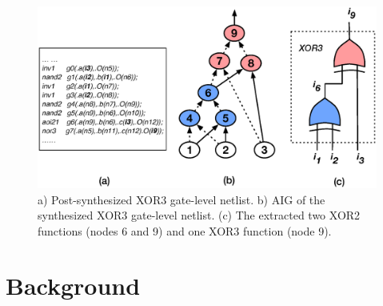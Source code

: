 \begin{figure}[!htb] 
\begin{center}
\includegraphics[scale=0.35]{../figs/aig-xor3.eps}
\caption{a) Post-synthesized XOR3 gate-level netlist. b) AIG of the synthesized XOR3 gate-level netlist. (c) The extracted two XOR2 functions (nodes 6 and 9) and one XOR3 function (node 9).}
\label{fig:xor3-aig}
\end{center}
\end{figure}

\section{Background} \label{sec:related-work}

